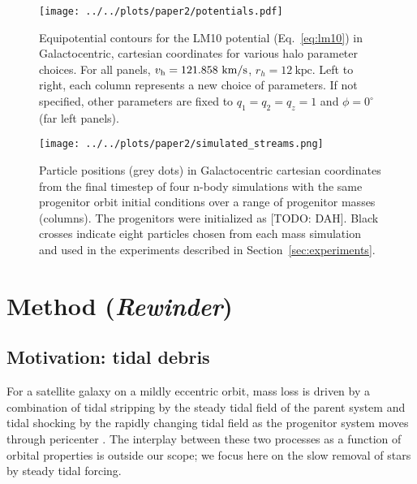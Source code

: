 \documentclass[letterpaper,12pt,preprint]{aastex}
\newcommand{\vhalo}{v_{\rm h}}
\newcommand{\rewinder}{\emph{Rewinder}}
\begin{document}
\begin{figure}[h]
\begin{center}
\texttt{[image: ../../plots/paper2/potentials.pdf]}
\caption{ Equipotential contours for the LM10 potential (Eq.~\ref{eq:lm10}) in Galactocentric, cartesian coordinates for various halo parameter choices. For all panels, $\vhalo=121.858~\mathrm{km}/\mathrm{s}$, $r_h=12~\mathrm{kpc}$. Left to right, each column represents a new choice of parameters. If not specified, other parameters are fixed to $q_1=q_2=q_z=1$ and $\phi=0^\circ$ (far left panels).  }\label{fig:potential}
\end{center}
\end{figure}

\begin{figure}[h]
\begin{center}
\texttt{[image: ../../plots/paper2/simulated\_streams.png]}
\caption{ Particle positions (grey dots) in Galactocentric cartesian coordinates from the final timestep of four n-body simulations with the same progenitor orbit initial conditions over a range of progenitor masses (columns). The progenitors were initialized as [TODO: DAH]. Black crosses indicate eight particles chosen from each mass simulation and used in the experiments described in Section~\ref{sec:experiments}.}\label{fig:sims}
\end{center}
\end{figure}

\section{Method (\rewinder)}

\subsection{Motivation: tidal debris}\label{sec:debris}

For a satellite galaxy on a mildly eccentric orbit, mass loss is driven by a combination of tidal stripping by the steady tidal field of the parent system and tidal shocking by the rapidly changing tidal field as the progenitor system moves through pericenter \citep[e.g.,][]{choi09}. The interplay between these two processes as a function of orbital properties is outside our scope; we focus here on the slow removal of stars by steady tidal forcing. 
\end{document}
